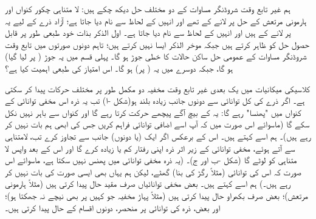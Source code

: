  ہم  غیر تابع وقت شروڈنگر مساوات کے دو مختلف حل دیکھ چکے ہیں:  لا متناہی چکور  کنواں اور ہارمونی مرتعش کے حل  پر لانے کے  تھے اور انہیں   کے لحاظ سے نام دیا جاتا ہے؛  آزاد ذرے کے لیے یہ  پر لانے کے  ہیں اور انہیں   کے لحاظ  سے نام دیا جاتا ہے۔ اول الذکر بذات خود طبعی طور پر قابل حصول حل کو ظاہر کرتے ہیں جبکہ موخر الذکر  ایسا نہیں کرتے ہیں؛ تاہم دونوں صورتوں میں تابع وقت شروڈنگر  مساوات کے عمومی حل ساکن حالات کا خطی جوڑ ہو گا۔ پہلی قسم میں یہ جوڑ  ( پر لیا گیا)  ہو گا، جبکہ دوسرے میں یہ ( پر)  ہو گا۔ اس امتیاز کی طبعی اہمیت کیا ہے؟

 کلاسیکی میکانیات میں یک بعدی غیر تابع وقت مخفیہ دو مکمل طور پر مختلف حرکات پیدا کر سکتی ہے۔ اگر   ذرے کی کل توانائی  سے دونوں  جانب زیادہ بلند ہو(شکل    -ا) تب یہ ذرہ اس مخفی توانائی کے کنواں میں "پھنسا" رہے گا: یہ  کے بیچ آگے پیچھے حرکت کرتا رہے گا اور کنواں سے باہر نہیں نکل سکے گا (ماسوائے اس صورت میں کہ آپ اسے اضافی توانائی فراہم کریں جس کی ابھی ہم بات نہیں کر رہے ہیں)۔ ہم اسے  کہتے ہیں۔ اس کے برعکس اگر   ایک (یا دونوں) جانب     سے  تجاوز کرے تب،  لامتناہی سے آتے ہوئے، مخفی توانائی کے زیر اثر ذرہ اپنی رفتار کم یا زیادہ  کرے گا اور اس کے بعد واپس لا متناہی کو لوٹے گا   (شکل  -ب اور ج)۔ (یہ ذرہ مخفی توانائی میں پھنس نہیں سکتا ہے، ماسوائے اس صورت  کہ اس کی توانائی (مثلاً رگڑ کی بنا) گھٹے، لیکن ہم یہاں بھی ایسی صورت کی بات نہیں کر رہے ہیں۔) ہم اسے  کہتے ہیں۔ بعض مخفی توانائیاں صرف مقید حال پیدا کرتی ہیں (مثلاً ہارمونی  مرتعش)؛  بعض صرف بکھراو حال پیدا کرتی  ہیں (مثلاً  پہاڑ مخفیہ  جو کہیں پر بھی نیچے نہ جھکتا ہو)؛ اور بعض، ذرہ کی توانائی پر منحصر، دونوں اقسام کے حال پیدا کرتی ہیں۔

